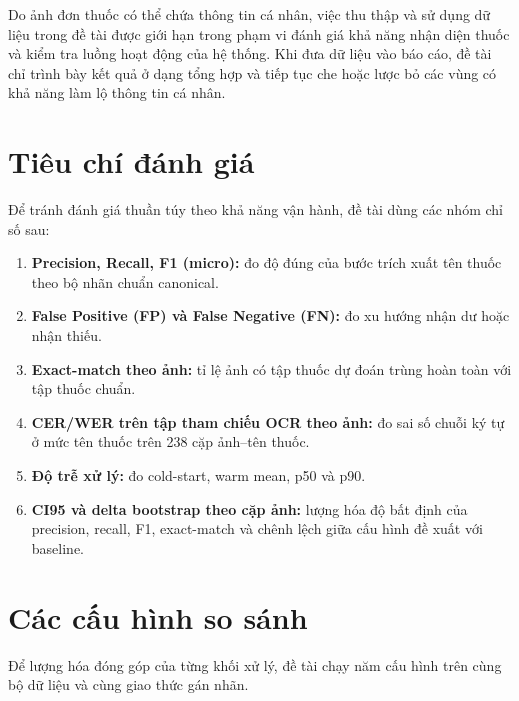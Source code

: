 \documentclass[12pt,a4paper]{report}
\begin{document}
Do ảnh đơn thuốc có thể chứa thông tin cá nhân, việc thu thập và sử dụng dữ liệu trong đề tài được giới hạn trong phạm vi đánh giá khả năng nhận diện thuốc và kiểm tra luồng hoạt động của hệ thống. Khi đưa dữ liệu vào báo cáo, đề tài chỉ trình bày kết quả ở dạng tổng hợp và tiếp tục che hoặc lược bỏ các vùng có khả năng làm lộ thông tin cá nhân.

\section{Tiêu chí đánh giá}

Để tránh đánh giá thuần túy theo khả năng vận hành, đề tài dùng các nhóm chỉ số sau:

\begin{enumerate}[label=\arabic*.]
    \item \textbf{Precision, Recall, F1 (micro):} đo độ đúng của bước trích xuất tên thuốc theo bộ nhãn chuẩn canonical.
    \item \textbf{False Positive (FP) và False Negative (FN):} đo xu hướng nhận dư hoặc nhận thiếu.
    \item \textbf{Exact-match theo ảnh:} tỉ lệ ảnh có tập thuốc dự đoán trùng hoàn toàn với tập thuốc chuẩn.
    \item \textbf{CER/WER trên tập tham chiếu OCR theo ảnh:} đo sai số chuỗi ký tự ở mức tên thuốc trên 238 cặp ảnh--tên thuốc.
    \item \textbf{Độ trễ xử lý:} đo cold-start, warm mean, p50 và p90.
    \item \textbf{CI95 và delta bootstrap theo cặp ảnh:} lượng hóa độ bất định của precision, recall, F1, exact-match và chênh lệch giữa cấu hình đề xuất với baseline.
\end{enumerate}

\section{Các cấu hình so sánh}

Để lượng hóa đóng góp của từng khối xử lý, đề tài chạy năm cấu hình trên cùng bộ dữ liệu và cùng giao thức gán nhãn.
\end{document}
